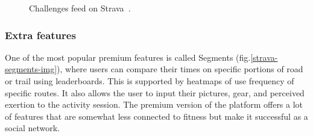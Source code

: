 \begin{figure}[h]
    \centering
    \caption{Challenges feed on Strava~\cite{strava-challenges}.}
    \label{strava-challenges}
\end{figure}

\subsubsection*{Extra features}
One of the most popular premium features is called Segments (fig.\ref{strava-segments-img}), where users can compare their times on specific portions of road or trail using leaderboards.
This is supported by heatmaps of use frequency of specific routes.
It also allows the user to input their pictures, gear, and perceived exertion to the activity session.
The premium version of the platform offers a lot of features that are somewhat less connected to fitness but make it successful as a social network.

